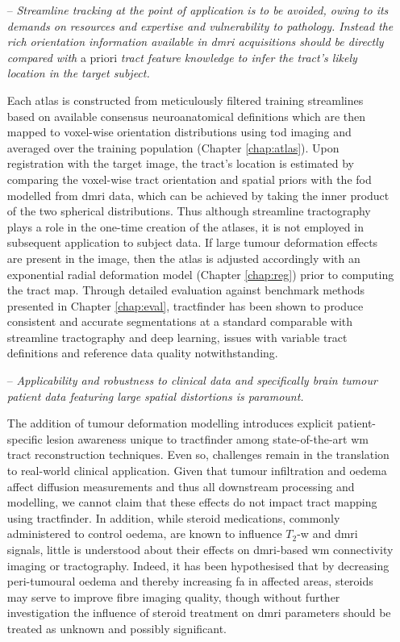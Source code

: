 \begin{itemize}


\item[--]\textit{Streamline tracking at the point of application is to be avoided, owing to its demands on resources and expertise and vulnerability to pathology.
Instead the rich orientation information available in \gls{dmri} acquisitions should be directly compared with} a priori \textit{tract feature knowledge to infer the tract's likely location in the target subject.}

Each atlas is constructed from meticulously filtered training streamlines based on available consensus neuroanatomical definitions which are then mapped to voxel-wise orientation distributions using \gls{tod} imaging and averaged over the training population (Chapter \ref{chap:atlas}).
Upon registration with the target image, the tract's location is estimated by comparing the voxel-wise tract orientation and spatial priors with the \gls{fod} modelled from \gls{dmri} data, which can be achieved by taking the inner product of the two spherical distributions.
Thus although streamline tractography plays a role in the one-time creation of the atlases, it is not employed in subsequent application to subject data.
If large tumour deformation effects are present in the image, then the atlas is adjusted accordingly with an exponential radial deformation model (Chapter \ref{chap:reg}) prior to computing the tract map.
Through detailed evaluation against benchmark methods presented in Chapter \ref{chap:eval}, tractfinder has been shown to produce consistent and accurate segmentations at a standard comparable with streamline tractography and deep learning, issues with variable tract definitions and reference data quality notwithstanding.

\item[--]\textit{Applicability and robustness to clinical data and specifically brain tumour patient data featuring large spatial distortions is paramount.}

The addition of tumour deformation modelling introduces explicit patient-specific lesion awareness unique to tractfinder among state-of-the-art \gls{wm} tract reconstruction techniques.\autocite{Coenen2005a}
Even so, challenges remain in the translation to real-world clinical application.
Given that tumour infiltration and oedema affect diffusion measurements and thus all downstream processing and modelling, we cannot claim that these effects do not impact tract mapping using tractfinder.
In addition, while steroid medications, commonly administered to control oedema, are known to influence $T_2$-w and \gls{dmri} signals\autocite{Steens2005,Moll2020}, little is understood about their effects on \gls{dmri}-based \gls{wm} connectivity imaging or tractography\autocite{Coenen2005a}.
Indeed, it has been hypothesised that by decreasing peri-tumoural oedema and thereby increasing \gls{fa} in affected areas, steroids may serve to improve fibre imaging quality\autocite{Coenen2005a}, though without further investigation the influence of steroid treatment on \gls{dmri} parameters should be treated as unknown and possibly significant.


\end{itemize}
